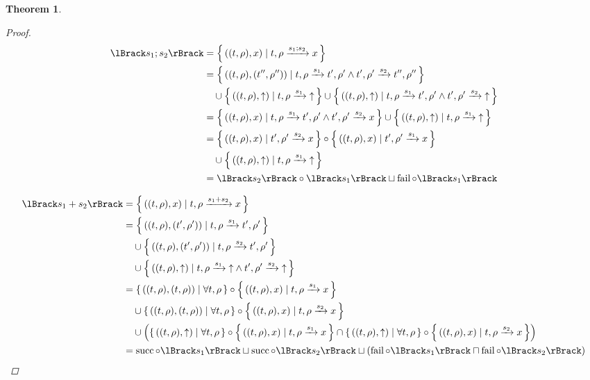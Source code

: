\documentclass{article}
\newtheorem{theorem}{Theorem}
\newcommand{\fail}{\ensuremath \text{$\uparrow$}}
\newcommand{\seq}[2]{\ensuremath #1 ; #2}
\newcommand{\choice}[2]{\ensuremath #1 + #2}
\newcommand{\transform}[5]{#1, #2 \xrightarrow{#3} #4, #5}
\newcommand{\transformx}[4]{#1, #2 \xrightarrow{#3} #4}
\newcommand{\transformfail}[3]{#1, #2 \xrightarrow{#3} \fail}
\newcommand{\sem}[1]{\ensuremath \lBrack #1 \rBrack}
\newcommand{\setbuild}[2]{\ensuremath \left\{\, #1 \mid #2 \,\right\}}
\newcommand{\lfail}{\ensuremath \operatorname{fail}}
\newcommand{\lsucc}{\ensuremath \operatorname{succ}}
\begin{document}
\begin{theorem}
\begin{proof}
\begin{align*}
  \sem{\seq{s_1}{s_2}}
    &= \setbuild{((t,\rho),x)}{\transformx{t}{\rho}{\seq{s_1}{s_2}}{x}} \\
    &= \setbuild{((t,\rho),(t'',\rho''))}{\transform{t}{\rho}{s_1}{t'}{\rho'} \land \transform{t'}{\rho'}{s_2}{t''}{\rho''}}\\
    &\quad \cup \setbuild{((t,\rho),\fail)}{\transformfail{t}{\rho}{s_1}} \cup \setbuild{((t,\rho),\fail)}{\transform{t}{\rho}{s_1}{t'}{\rho'} \land \transformfail{t'}{\rho'}{s_2}} \\
    &= \setbuild{((t,\rho),x)}{\transform{t}{\rho}{s_1}{t'}{\rho'} \land \transformx{t'}{\rho'}{s_2}{x}} \cup \setbuild{((t,\rho),\fail)}{\transformfail{t}{\rho}{s_1}} \\
    &= \setbuild{((t,\rho),x)}{\transformx{t'}{\rho'}{s_2}{x}} \circ \setbuild{((t,\rho),x)}{\transformx{t'}{\rho'}{s_1}{x}} \\
    &\quad \cup \setbuild{((t,\rho),\fail)}{\transformfail{t}{\rho}{s_1}} \\
    &= \sem{s_2} \circ \sem{s_1} \sqcup \lfail \circ \sem{s_1}
\end{align*}

\begin{align*}
  \sem{\choice{s_1}{s_2}}
     &= {\setbuild{((t,\rho),x)}{\transformx{t}{\rho}{\choice{s_1}{s_2}}{x}}} \\
     &= {\setbuild{((t,\rho),(t',\rho'))}{\transform{t}{\rho}{s_1}{t'}{\rho'}}} \\
     &\quad \cup {\setbuild{((t,\rho),(t',\rho'))}{\transform{t}{\rho}{s_2}{t'}{\rho'}}} \\
     &\quad \cup {\setbuild{((t,\rho),\fail)}{\transformfail{t}{\rho}{s_1} \land \transformfail{t'}{\rho'}{s_2}}} \\
     &= {\setbuild{((t,\rho),(t,\rho))}{\forall t, \rho}} \circ {\setbuild{((t,\rho),x)}{\transformx{t}{\rho}{s_1}{x}}} \\
     &\quad \cup {\setbuild{((t,\rho),(t,\rho))}{\forall t, \rho}} \circ {\setbuild{((t,\rho),x)}{\transformx{t}{\rho}{s_2}{x}}} \\
     &\quad \cup \left({\setbuild{((t,\rho),\fail)}{\forall t, \rho}} \circ {\setbuild{((t,\rho),x)}{\transformx{t}{\rho}{s_1}{x}}}\cap {\setbuild{((t,\rho),\fail)}{\forall t, \rho}} \circ {\setbuild{((t,\rho),x)}{\transformx{t}{\rho}{s_2}{x}}} \right) \\
     &= \lsucc \circ \sem{s_1} \sqcup \lsucc \circ \sem{s_2} \sqcup (\lfail \circ \sem{s_1} \sqcap \lfail \circ \sem{s_2})
\end{align*}


\end{proof}
\end{theorem}
\end{document}
